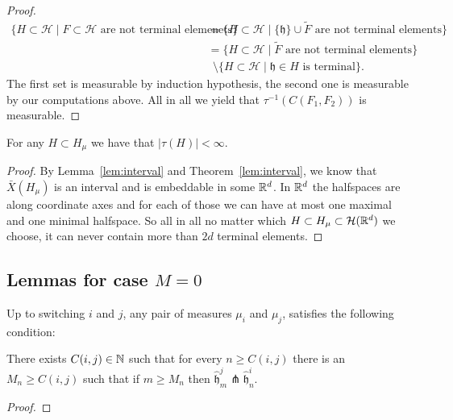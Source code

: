 \begin{proof}
  \begin{align*}
    \{H \subset \mathcal{H} \mid F \subset \mathcal{H} \text{ are not terminal elemenets}\}
    & = \{H \subset \mathcal{H} \mid \{\mathfrak{h}\} \cup \tilde F \text{ are not terminal elements}\}\\
    & = \{H \subset \mathcal{H} \mid \tilde{F} \text{ are not terminal elements}\} \\
    & \ \ \setminus \{H \subset \mathcal{H} \mid \mathfrak{h} \in H \text{ is terminal}\}.
  \end{align*}
  The first set is measurable by induction hypothesis, the second one is measurable by our computations above. All in all we yield that \(\tau^{-1}(C(F_1, F_2))\) is measurable.
\end{proof}

\begin{lemma}
  \label{lem:finite-terminal}
  For any \(H \subset H_\mu\) we have that \(|\tau(H)| < \infty\).
\end{lemma}

\begin{proof}
  By Lemma~\ref{lem:interval} and Theorem~\ref{lem:interval}, we know that \(\bar X(H_\mu)\) is an interval and is embeddable in some \(\mathbb{R}^d\). In \(\mathbb{R}^d\) the halfspaces are along coordinate axes and for each of those we can have at most one maximal and one minimal halfspace. So all in all no matter which \(H \subset H_\mu \subset \mathcal{H}(\mathbb{R}^d)\) we choose, it can never contain more than \(2d\) terminal elements.
\end{proof}

\subsection{Lemmas for case \(M=0\)}
\label{sec:M=0}

\begin{lemma}[{\cite[Lemma~4.13]{MR3509968}}]
  \label{lem:4.13}
  Up to switching \(i\) and \(j\), any pair of measures \(\mu_i\) and \(\mu_j\), satisfies the following condition:

  There exists \(C(i,j) \in \mathbb{N}\) such that for every \(n \geq C(i,j)\) there is an \(M_n \geq C(i,j)\) such that if \(m \geq M_n\) then \(\mathfrak{\hat h}^j_m \pitchfork \mathfrak{\hat h}^i_n\). 
\end{lemma}

\begin{proof}
\end{proof}

